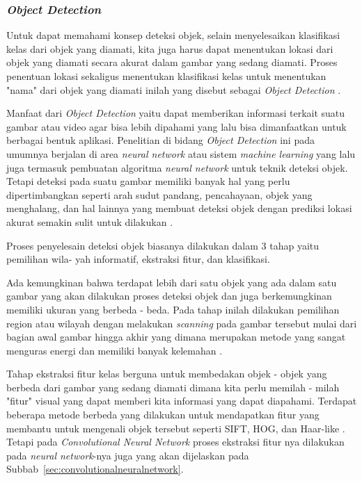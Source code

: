 \subsubsection{\emph{Object Detection}}
\label{sec:objectdetection}

\par Untuk dapat memahami konsep deteksi objek, selain menyelesaikan klasifikasi kelas dari objek yang diamati, kita juga harus dapat
menentukan lokasi dari objek yang diamati secara akurat dalam gambar yang sedang diamati. Proses penentuan lokasi sekaligus menentukan
klasifikasi kelas untuk menentukan "nama" dari objek yang diamati inilah yang disebut sebagai \emph{Object Detection} \cite{felzenszwalb2010object}.

\par Manfaat dari \emph{Object Detection} yaitu dapat memberikan informasi terkait suatu gambar atau video agar bisa lebih dipahami yang lalu bisa dimanfaatkan
untuk berbagai bentuk aplikasi. Penelitian di bidang \emph{Object Detection} ini pada umumnya berjalan di area \emph{neural network} atau sistem \emph{machine learning}
yang lalu juga termasuk pembuatan algoritma \emph{neural network} untuk teknik deteksi objek. Tetapi deteksi pada suatu gambar memiliki banyak
hal yang perlu dipertimbangkan seperti arah sudut pandang, pencahayaan, objek yang menghalang, dan hal lainnya yang membuat
deteksi objek dengan prediksi lokasi akurat semakin sulit untuk dilakukan \cite{zhao2019object} \cite{girshick2014rich}.

\par Proses penyelesain deteksi objek biasanya dilakukan dalam 3 tahap yaitu pemilihan wila- yah informatif, ekstraksi fitur, dan
klasifikasi.

\par Ada kemungkinan bahwa terdapat lebih dari satu objek yang ada dalam satu gambar yang akan dilakukan proses deteksi objek dan
juga berkemungkinan memiliki ukuran yang berbeda - beda. Pada tahap inilah dilakukan pemilihan region atau wilayah dengan melakukan \emph{scanning} pada gambar tersebut mulai
dari bagian awal gambar hingga akhir yang dimana merupakan metode yang sangat menguras energi dan memiliki banyak kelemahan \cite{zhao2019object}.

\par Tahap ekstraksi fitur kelas berguna untuk membedakan objek - objek yang berbeda dari gambar yang sedang diamati dimana kita perlu
memilah - milah "fitur" visual yang dapat memberi kita informasi yang dapat diapahami. Terdapat beberapa metode berbeda yang dilakukan
untuk mendapatkan fitur yang membantu untuk mengenali objek tersebut seperti SIFT, HOG, dan Haar-like \cite{zhao2019object}. Tetapi pada \emph{Convolutional Neural Network}
proses ekstraksi fitur nya dilakukan pada \emph{neural network}-nya juga yang akan dijelaskan pada Subbab~\ref{sec:convolutionalneuralnetwork}.

